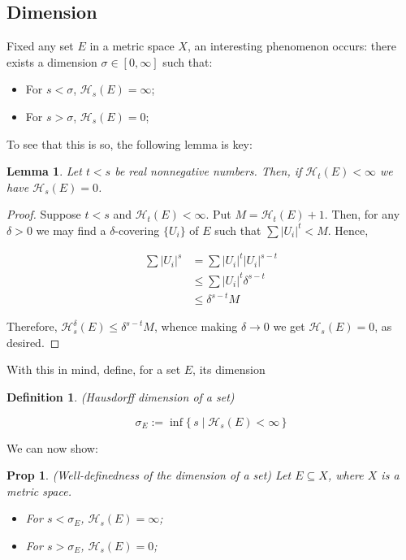 \documentclass[11pt]{amsart}
\newcommand{\HH}{\mathcal{H}}
\newtheorem{lemma}{Lemma}
\newtheorem{prop}{Prop}
\newtheorem{definition}{Definition}
\begin{document}
\subsection{Dimension}

Fixed any set $E$ in a metric space $X$, an interesting phenomenon occurs: there exists a dimension $\sigma \in \left[0, \infty\right]$ such that:

\begin{itemize}
\item For $s < \sigma$, $\HH_s(E) = \infty$;

\item For $s > \sigma$, $\HH_s(E) = 0$;
\end{itemize}

To see that this is so, the following lemma is key:

\begin{lemma}\label{helperdimension}
Let $t < s$ be real nonnegative numbers. Then, if $\HH_t(E) < \infty$ we have $\HH_s(E) = 0$.
\end{lemma}

\begin{proof}
Suppose $t < s$ and $\HH_t(E) < \infty$. Put $M = \HH_t(E) + 1$. Then, for any $\delta > 0$ we may find a $\delta$-covering $\{U_i\}$ of $E$ such that $\sum \lvert U_i \rvert^t < M$. Hence, 

\begin{align*}
\sum \lvert U_i \rvert^s &= \sum \lvert U_i \rvert^t \lvert U_i \rvert^{s - t}\\
&\leq \sum \lvert U_i \rvert^t \delta^{s-t}\\
&\leq \delta^{s-t} M
\end{align*}

Therefore, $\HH_s^\delta(E) \leq \delta^{s-t} M$, whence making $\delta \to 0$ we get $\HH_s(E) = 0$, as desired.
\end{proof}

With this in mind, define, for a set $E$, its dimension

\begin{definition} (Hausdorff dimension of a set)

\[\sigma_E := \inf \{\, s \mid \HH_s(E) < \infty \,\}\]
\end{definition}

We can now show:

\begin{prop}
(Well-definedness of the dimension of a set) Let $E \subseteq X$, where $X$ is a metric space.

\begin{itemize}
\item For $s < \sigma_E$, $\HH_s(E) = \infty$;

\item For $s > \sigma_E$, $\HH_s(E) = 0$;
\end{itemize}

\end{prop}
\end{document}
